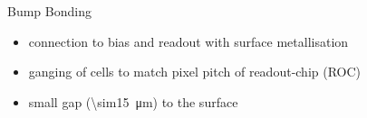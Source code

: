\begin{frame}{Bump Bonding}

	
	
	\begin{itemize}\itemfill
		\item connection to bias and readout with surface metallisation
		\item ganging of cells to match pixel pitch of readout-chip (ROC)
		\item small gap (\SI{\sim15}{\micro\meter}) to the surface
	\end{itemize}

\end{frame}

